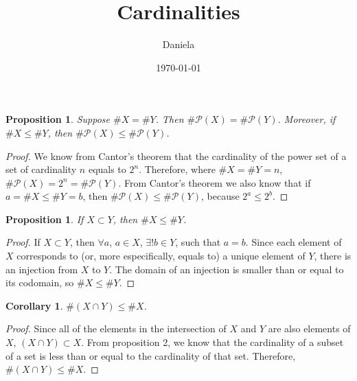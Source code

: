 \documentclass[11pt,reqno,oneside,a4paper]{article}
\title{Cardinalities}
\author{Daniela}
\date{\today}
\newtheorem{proposition}[theorem]{Proposition}
\newtheorem{corollary}[theorem]{Corollary}
\begin{document}
\maketitle

\begin{proposition} \label{proposition:PowerSetsPreserveEquinumerosity}
	Suppose $\# X=\# Y$.
	Then $\# \mathcal{P}(X)=\# \mathcal{P}(Y)$.
	Moreover, if $\# X\leq\# Y$, then $\# \mathcal{P}(X)\leq\# \mathcal{P}(Y)$.
\end{proposition}

\begin{proof}
We know from Cantor's theorem that the cardinality of the power set of a set of cardinality $n$ equals to $2^n$. Therefore, where $\# X=\# Y = n $, $\# \mathcal{P}(X)= 2^n = \# \mathcal{P}(Y)$. From Cantor's theorem we also know that  if $a = \# X\leq\# Y = b$, then $\#\mathcal{P}(X)\leq\# \mathcal{P}(Y)$, because $2^a \leq 2^b$.
\end{proof}

\begin{proposition} \label{prop:SubsetCardinality}
	If $X\subset Y$, then $\# X\leq \# Y$.
\end{proposition}

\begin{proof}
If $X\subset Y$, then $\forall a$, $a \in X$, $	\exists! b \in Y$, such that $a=b$. Since each element of $X$ corresponds to (or, more especifically, equals to) a unique element of $Y$, there is an injection from $X$ to $Y$. The domain of an injection is smaller than or equal to its codomain, so  $\# X\leq \# Y$.
\end{proof}

\begin{corollary} \label{cor:IntersectionCardinality}
	$\# (X\cap Y) \leq \# X$.
\end{corollary}

\begin{proof}
Since all of the elements in the intersection of $X$ and $Y$ are also elements of $X$, $(X \cap Y)\subset X$. From proposition 2, we know that the cardinality of a subset of a set is less than or equal to the cardinality of that set. Therefore, $\#(X\cap Y) \leq \#X$.
\end{proof}
\end{document}
